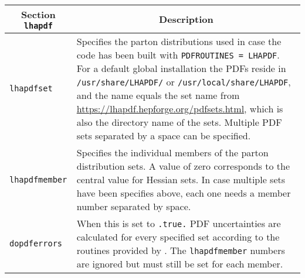 	\begin{longtable}{p{1.5cm}p{12cm}}
		\toprule
		\multicolumn{1}{c}{{\textbf{Section} \texttt{lhapdf}}} & \multicolumn{1}{c}{{\textbf{Description}}} \\ 
		\midrule
		\texttt{lhapdfset} &
		Specifies the parton distributions used in case the code has been built with
		\texttt{PDFROUTINES = LHAPDF}. For a default global installation the PDFs reside
		in \texttt{/usr/share/LHAPDF/} or \texttt{/usr/local/share/LHAPDF}, and the name
		equals the set name from \url{https://lhapdf.hepforge.org/pdfsets.html}, which is
		also the directory name of the sets. Multiple PDF sets separated by a space can be specified. \\
		\texttt{lhapdfmember} & Specifies the individual members of the parton distribution sets.
		A value of zero corresponds to the central value for Hessian sets. In case multiple sets
		have been specifies above, each one needs a member number separated by space. \\
		\texttt{dopdferrors} & When this is set to \texttt{.true.} PDF uncertainties are calculated
		for every specified \PDF{} set according to the routines provided by \LHAPDF{}.
		The \texttt{lhapdfmember} numbers are ignored but must still be set for each member. \\
		\bottomrule
	\end{longtable}

